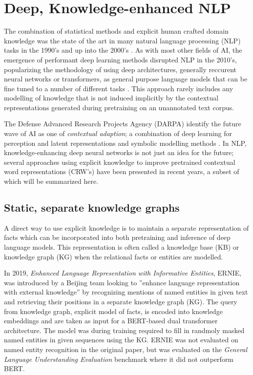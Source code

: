\documentclass[main.tex]{subfiles}
\begin{document}
\section{Deep, Knowledge-enhanced NLP}
The combination of statistical methods and explicit human crafted domain knowledge was the state of the art in many natural language processing (NLP) tasks in the 1990's and up into the 2000's \cite[Sec. 22.5]{russell2016ai}.
As with most other fields of AI, the emergence of performant deep learning methods disrupted NLP in the 2010's, popularizing the methodology of using deep architectures, generally reccurent neural networks or transformers, as general purpose language models that can be fine tuned to a number of different tasks \cite{otter18dlnlp}.
This approach rarely includes any modelling of knowledge that is not induced implicitly by the contextual representations generated during pretraining on an unannotated text corpus.

The Defense Advanced Research Projects Agency (DARPA) identify the future wave of AI as one of \emph{contextual adaption}; a combination of deep learning for perception and latent representations and symbolic modelling methods \cite{darpa17ai}.
In NLP, knowledge-enhancing deep neural networks is not just an idea for the future; several approaches using explicit knowledge to improve pretrained contextual word representations (CRW's) have been presented in recent years, a subset of which will be summarized here.

\subsection{Static, separate knowledge graphs}
A direct way to use explicit knowledge is to maintain a separate representation of facts which can be incorporated into both pretraining and inference of deep language models.
This representation is often called a knowledge base (KB) or knowledge graph (KG) when the relational facts or entities are modelled.

In 2019, \emph{Enhanced Language Representation with Informative Entities}, ERNIE, was introduced by a Beijing team \cite{zhang2019ernie} looking to ''enhance language representation  with  external  knowledge'' \cite[1]{zhang2019ernie} by recognizing mentions of named entities in given text and retrieving their positions in a separate knowledge graph (KG).
The query from knowledge graph, explicit model of facts, is encoded into knowledge embeddings and are taken as input for a BERT-based dual transformer architecture.
The model was during training required to fill in randmoly masked named entities in given sequences using the KG.
ERNIE was not evaluated on named entity recognition in the original paper, but was evaluated on the \emph{General Language Understanding Evaluation} benchmark \cite{wang2018glue} where it did not outperform BERT.
\end{document}
